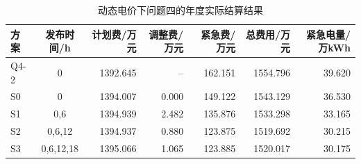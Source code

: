 \begin{table}[H]
\centering\footnotesize
\caption{动态电价下问题四的年度实际结算结果}\label{tab:q4-dispatch-results}
\setlength{\tabcolsep}{3.5pt}
\begin{tabular}{lcrrrrr}
\toprule
方案 & 发布时间/h & 计划费/万元 & 调整费/万元 & 紧急费/万元 & 总费用/万元 & 紧急电量/万kWh \\
\midrule
Q4-2 & 0 & 1392.645 & -- & 162.151 & 1554.796 & 39.620 \\
S0 & 0 & 1394.007 & 0.000 & 149.122 & 1543.129 & 36.530 \\
S1 & 0,6 & 1394.939 & 2.482 & 135.876 & 1533.298 & 33.165 \\
S2 & 0,6,12 & 1394.937 & 0.880 & 123.875 & 1519.692 & 30.215 \\
S3 & 0,6,12,18 & 1395.066 & 1.065 & 123.885 & 1520.017 & 30.175 \\
\bottomrule
\end{tabular}
\end{table}
